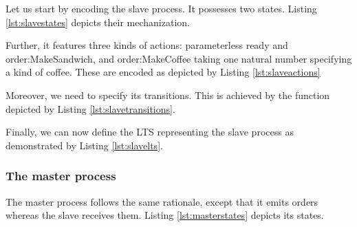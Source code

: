 		Let us start by encoding the slave process. It possesses two states. Listing \ref{lst:slavestates}
		depicts their mechanization.
		
  	


	\noindent Further, it features three kinds of \textsf{actions}: parameterless \textsf{ready} and \textsf{order:MakeSandwich},
	and \textsf{order:MakeCoffee} taking one natural number specifying a kind of coffee. These are encoded as depicted by
	Listing \ref{lst:slaveactions}

	 	

	\noindent Moreover, we need to specify its transitions. This is achieved by the function depicted
	by Listing \ref{lst:slavetransitions}.

		 	

	\noindent Finally, we can now define the \textsf{LTS} representing the slave process as
	demonstrated by Listing \ref{lst:slavelts}.
	
			 	


\subsubsection{The master process}	
\label{subsub:master}

	The master process follows the same rationale, except that it emits orders whereas the slave
	receives them. Listing \ref{lst:masterstates} depicts its states.
	
			 	

